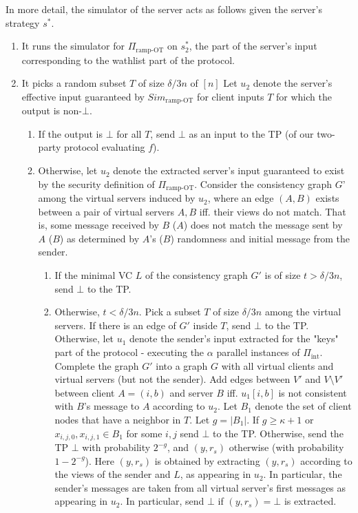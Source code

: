 \documentclass{llncs}
\newcommand{\INT}{\Pi_{\operatorname{int}}}
\begin{document}
{In more detail, the simulator of the server acts as follows given the server's strategy $s^*$.
\begin{enumerate}
	\item It runs the simulator for $\Pi_{\text{ramp-OT}}$ on $s^*_2$, the part of the server's input corresponding to the wathlist part of the protocol.
	\item It picks a random  subset $T$ of size $\delta/3 n$ of $[n]$ Let $u_2$ denote the server's effective input guaranteed by $Sim_{\text{ramp-OT}}$ for client inputs $T$ for which the output is non-$\bot$. 
	\begin{enumerate}
	\item If the output is $\bot$ for all $T$, send $\bot$ as an input to the TP (of our two-party protocol evaluating $f$).
	\item Otherwise, let $u_2$ denote the extracted server's input guaranteed to exist by the security definition of $\Pi_{\text{ramp-OT}}$.
	Consider the consistency graph $G$' among the virtual servers induced by $u_2$, where an edge $(A,B)$ exists between a pair of virtual servers $A,B$ iff. their views do not match. That is, some message received by $B$ ($A$) does not match the message sent by $A$ ($B$) as determined by $A$'s ($B$) randomness and initial message from the sender.
	\begin{enumerate}
		\item If the minimal VC $L$ of the consistency graph $G'$ is of size $t>\delta/3 n$, send $\bot$ to the TP.
		\item Otherwise, $t<\delta/3 n$. Pick a subset $T$ of size $\delta/3 n$ among the virtual servers. If there is an edge of $G'$ inside $T$, send $\bot$ to the TP. Otherwise, let $u_1$ denote the sender's input extracted for the "keys" part of the protocol - executing the $\alpha$ parallel instances of $\INT$. 
		Complete the graph $G'$ into a graph $G$ with all virtual clients and virtual servers (but not the sender). Add edges between $V'$ and $V\setminus{V'}$ between client $A=(i,b)$ and server $B$ iff. $u_1[i,b]$ is not consistent with $B$'s message to $A$ according to $u_2$. 
		Let $B_1$ denote the set of client nodes that have a neighbor in $T$. Let $g=|B_1|$. If $g\geq \kappa+1$ or $x_{i,j,0},x_{i,j,1}\in B_1$ for some $i,j$ send $\bot$ to the TP. Otherwise, send the TP $\bot$ with probability $2^{-g}$, and $(y,r_s)$ otherwise (with probability $1-2^{-g}$). Here $(y,r_s)$ is obtained by extracting $(y,r_s)$ according to the views of the sender and $L$, as appearing in $u_2$. In particular, the sender's messages are taken from all virtual server's first messages as appearing in $u_2$. In particular, send $\bot$ if $(y,r_s)=\bot$ is extracted.

\end{enumerate}
\end{enumerate}
\end{enumerate}}
\end{document}
